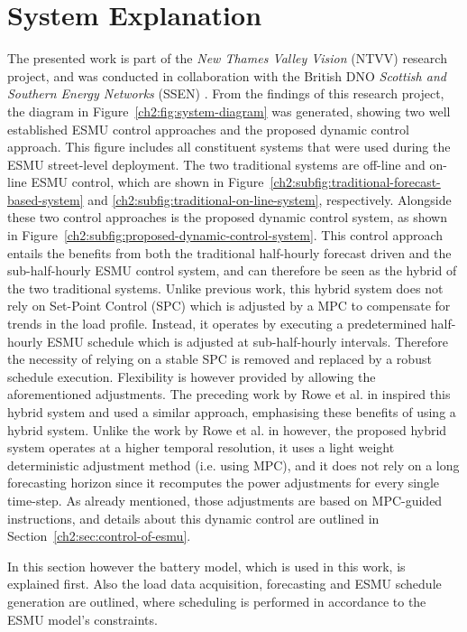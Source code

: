 \section{System Explanation}
\label{ch2:sec:system-explanation}



The presented work is part of the \textit{New Thames Valley Vision} (NTVV) research project, and was conducted in collaboration with the British DNO \textit{Scottish and Southern Energy Networks} (SSEN) \cite{NTVV2016}.
From the findings of this research project, the diagram in Figure~\ref{ch2:fig:system-diagram} was generated, showing two well established ESMU control approaches and the proposed dynamic control approach.
This figure includes all constituent systems that were used during the ESMU street-level deployment.
The two traditional systems are off-line and on-line ESMU control, which are shown in Figure~\ref{ch2:subfig:traditional-forecast-based-system} and \ref{ch2:subfig:traditional-on-line-system}, respectively.
Alongside these two control approaches is the proposed dynamic control system, as shown in Figure~\ref{ch2:subfig:proposed-dynamic-control-system}.
This control approach entails the benefits from both the traditional half-hourly forecast driven and the sub-half-hourly ESMU control system, and can therefore be seen as the hybrid of the two traditional systems.
Unlike previous work, this hybrid system does not rely on Set-Point Control (SPC) which is adjusted by a MPC to compensate for trends in the load profile.
Instead, it operates by executing a predetermined half-hourly ESMU schedule which is adjusted at sub-half-hourly intervals.
Therefore the necessity of relying on a stable SPC is removed and replaced by a robust schedule execution.
Flexibility is however provided by allowing the aforementioned adjustments.
The preceding work by Rowe et al. in \cite{Rowe2014} inspired this hybrid system and used a similar approach, emphasising these benefits of using a hybrid system.
Unlike the work by Rowe et al. in \cite{Rowe2014} however, the proposed hybrid system operates at a higher temporal resolution, it uses a light weight deterministic adjustment method (i.e. using MPC), and it does not rely on a long forecasting horizon since it recomputes the power adjustments for every single time-step.
As already mentioned, those adjustments are based on MPC-guided instructions, and details about this dynamic control are outlined in Section~\ref{ch2:sec:control-of-esmu}.

In this section however the battery model, which is used in this work, is explained first.
Also the load data acquisition, forecasting and ESMU schedule generation are outlined, where scheduling is performed in accordance to the ESMU model's constraints.

